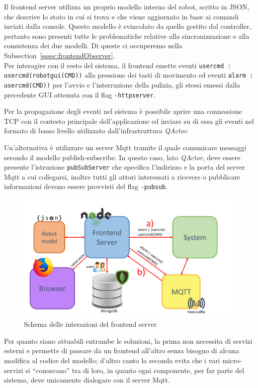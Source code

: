 \documentclass{../llncs}
\newcommand{\codescript}[1]{{\mbox{\small{\texttt{#1}}}}\xspace}
\newcommand{\qa}{\textsf{\textit{QActor}}\xspace}
\newcommand{\xsss}[1]{\subsectionname~\ref{sssec:#1}}
\newcommand{\labelfig}[1]{\label{fig:#1}}
\newcommand{\subsectionname}{Subsection}
\begin{document}
Il frontend server utilizza un proprio modello interno del robot, scritto in JSON, che descrive lo stato in cui si trova e che viene aggiornato in base ai comandi inviati dalla console. Questo modello è svincolato da quello gestito dal controller, pertanto sono presenti tutte le problematiche relative alla sincronizzazione e alla consistenza dei due modelli. Di queste ci occuperemo nella \xsss{frontendObserver}.\\

Per interagire con il resto del sistema, il frontend emette eventi \codescript{usercmd : usercmd(robotgui(CMD))} alla pressione dei tasti di movimento ed eventi \codescript{alarm : usercmd(CMD))} per l'avvio e l'interruzione della pulizia, gli stessi emessi dalla precedente GUI ottenuta con il flag \codescript{-httpserver}.

Per la propagazione degli eventi nel sistema è possibile aprire una connessione TCP con il contesto principale dell'applicazione ed inviare su di essa gli eventi nel formato di basso livello utilizzato dall'infrastruttura \qa.

Un'alternativa è utilizzare un server Mqtt tramite il quale comunicare messaggi secondo il modello publish-subscribe. In questo caso, lato \qa, deve essere presente l'istruzione \codescript{pubSubServer} che specifica l'indirizzo e la porta del server Mqtt a cui collegarsi, inoltre tutti gli attori interessati a ricevere o pubblicare informazioni devono essere provvisti del flag \codescript{-pubsub}.

\begin{figure}
\centering
\includegraphics[scale=0.40]{img/frontendServer.png}
\caption{Schema delle interazioni del frontend server}\labelfig{frontendServer}
\end{figure}

Per quanto siano attuabili entrambe le soluzioni, la prima non necessita di servizi esterni e permette di passare da un frontend all'altro senza bisogno di alcuna modifica al codice del modello; d'altro canto la seconda evita che i vari micro-servizi si ``conoscano'' tra di loro, in quanto ogni componente, per far parte del sistema, deve unicamente dialogare con il server Mqtt.
\end{document}
